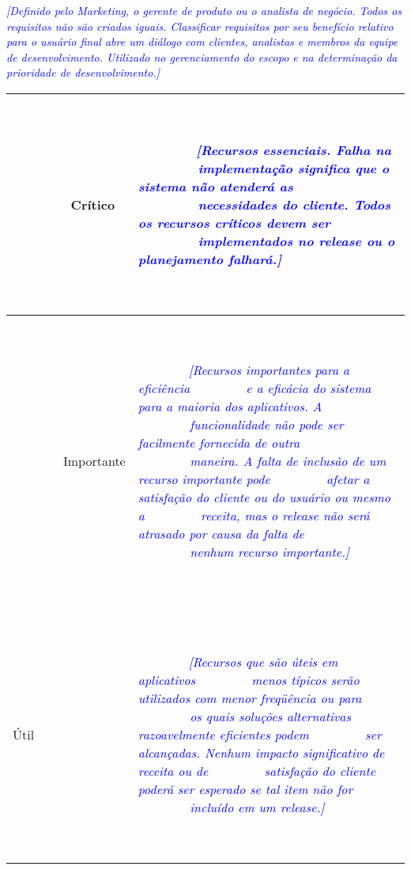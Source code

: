 \documentclass[a4paper]{article}
\begin{document}
\textit{\textcolor{blue}{[Definido pelo Marketing, o gerente de produto ou o analista de neg\'ocio. Todos os requisitos
n\~ao s\~ao criados iguais. Classificar requisitos por seu benef\'icio relativo para o usu\'ario final abre um
di\'alogo com clientes, analistas e membros da equipe de desenvolvimento. Utilizado no gerenciamento do escopo e na
determina\c{c}\~ao da prioridade de desenvolvimento.]}}


\bigskip


\bigskip


\bigskip


\bigskip

\begin{flushleft}
\tablefirsthead{}
\tablehead{}
\tabletail{}
\tablelasttail{}
\begin{supertabular}{|m{0.8205598in}|m{4.33026in}|}
\hline
~

\ \ \ \ \ \ \ \ Cr\'itico

~
 &
~

\ \ \ \ \ \ \ \ \textit{\textcolor{blue}{[Recursos essenciais. Falha na \ \ \ \ \ \ \ \ implementa\c{c}\~ao significa
que o sistema n\~ao atender\'a as \ \ \ \ \ \ \ \ necessidades do cliente. Todos os recursos cr\'iticos devem ser
\ \ \ \ \ \ \ \ implementados no release ou o planejamento falhar\'a.]}}

~
\\\hline
~

\ \ \ \ \ \ \ \ Importante

~
 &
~

\ \ \ \ \ \ \ \ \textit{\textcolor{blue}{[Recursos importantes para a efici\^encia \ \ \ \ \ \ \ \ e a efic\'acia do
sistema para a maioria dos aplicativos. A \ \ \ \ \ \ \ \ funcionalidade n\~ao pode ser facilmente fornecida de outra
\ \ \ \ \ \ \ \ maneira. A falta de inclus\~ao de um recurso importante pode \ \ \ \ \ \ \ \ afetar a satisfa\c{c}\~ao
do cliente ou do usu\'ario ou mesmo a \ \ \ \ \ \ \ \ receita, mas o release n\~ao ser\'a atrasado por causa da falta
de \ \ \ \ \ \ \ \ nenhum recurso importante.]}}

~
\\\hline
~

\'Util

~
 &
~

\ \ \ \ \ \ \ \ \textit{\textcolor{blue}{[Recursos que s\~ao \'uteis em aplicativos \ \ \ \ \ \ \ \ menos t\'ipicos
ser\~ao utilizados com menor freq\"u\^encia ou para \ \ \ \ \ \ \ \ os quais solu\c{c}\~oes alternativas razoavelmente
eficientes podem \ \ \ \ \ \ \ \ ser alcan\c{c}adas. Nenhum impacto significativo de receita ou de
\ \ \ \ \ \ \ \ satisfa\c{c}\~ao do cliente poder\'a ser esperado se tal item n\~ao for \ \ \ \ \ \ \ \ inclu\'ido em
um release.]}}

~
\\\hline
\end{supertabular}
\end{flushleft}
\end{document}
